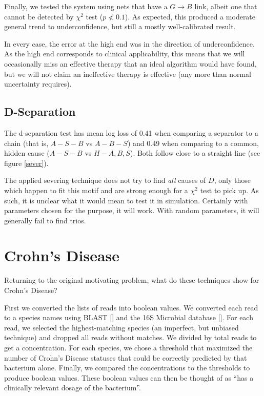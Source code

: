 \documentclass[letterpaper]{article}
\begin{document}
Finally, we tested the system using nets that have a $G\rightarrow B$
link, albeit one that cannot be detected by $\chi^2$ test
($p\not<0.1$).  As expected, this produced a moderate general trend to
underconfidence, but still a mostly well-calibrated result.

In every case, the error at the high end was in the direction of
underconfidence.  As the high end corresponds to clinical
applicability, this means that we will occasionally miss an effective
therapy that an ideal algorithm would have found, but we will not
claim an ineffective therapy is effective (any more than normal
uncertainty requires).


\subsection{D-Separation}

The d-separation test has mean log loss of 0.41 when comparing a
separator to a chain (that is, $A-S-B$ vs $A-B-S$) and 0.49 when
comparing to a common, hidden cause ($A-S-B$ vs $H-A,B,S$).  Both
follow close to a straight line (see figure \ref{sever}).

The applied severing technique does not try to find \textit{all}
causes of $D$, only
those which happen to fit this motif and are strong enough for a
$\chi^2$ test to pick up.  As such, it is unclear what it would mean
to test it in simulation.  Certainly with parameters chosen for the
purpose, it will work.  With random parameters, it will generally fail
to find trios.

\section{Crohn's Disease}

Returning to the original motivating problem, what do these techniques
show for Crohn's Disease?

First we converted the lists of reads into boolean
values.  We converted each read to a species names using BLAST [\cite{BLAST}]
and the 16S Microbial database [\cite{16S}].  For each read, we
selected the highest-matching species (an imperfect, but unbiased
technique) and dropped all reads without matches.  We divided by total
reads to get a concentration.  For each species, we chose a threshold that
maximized the number of Crohn's Disease statuses that could be
correctly predicted by that bacterium alone.  Finally, we compared the
concentrations to the thresholds to produce boolean values. These
boolean values can then be thought of as ``has a clinically relevant
dosage of the bacterium''.
\end{document}
